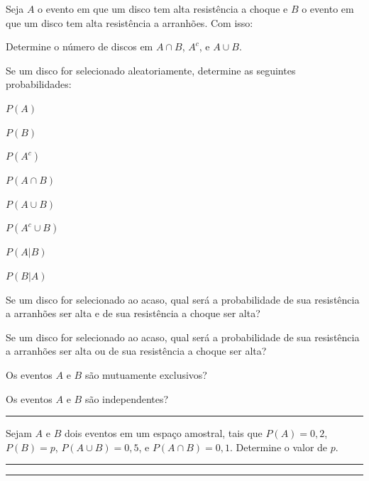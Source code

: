 \documentclass[a4paper,11pt,fleqn]{article}\usepackage[]{graphicx}\usepackage[]{color}
\theoremstyle{definition}
\begin{document}
\begin{compactenum}
  Seja $A$ o evento em que um disco tem alta resistência a choque e $B$
  o evento em que um disco tem alta resistência a arranhões. Com isso:
  \begin{compactenum}
  \item Determine o número de discos em $A \cap B$, $A^{c}$, e $A \cup B$.
  \item Se um disco for selecionado aleatoriamente, determine as
    seguintes probabilidades: \\
    \begin{inparaenum}
    \item $P(A)$ \,
    \item $P(B)$ \,
    \item $P(A^{c})$ \,
    \item $P(A \cap B)$ \,
    \item $P(A \cup B)$ \,
    \item $P(A^{c} \cup B)$ \,
    \item $P(A|B)$ \,
    \item $P(B|A)$
    \end{inparaenum}
  \item Se um disco for selecionado ao acaso, qual será a probabilidade
    de sua resistência a arranhões ser alta e de sua resistência a
    choque ser alta?
  \item Se um disco for selecionado ao acaso, qual será a probabilidade
    de sua resistência a arranhões ser alta ou de sua resistência a
    choque ser alta?
  \item Os eventos $A$ e $B$ são mutuamente exclusivos?
  \item Os eventos $A$ e $B$ são independentes?
  \end{compactenum}

\vspace{0.3cm}
\hrule
\vspace{0.3cm}

\item Sejam $A$ e $B$ dois eventos em um espaço amostral, tais que $P(A)
  = 0,2$, $P(B) = p$, $P(A \cup B) = 0,5$, e $P(A \cap B) =
  0,1$. Determine o valor de $p$.

\vspace{0.3cm}
\hrule
\vspace{0.3cm}

\clearpage

\vspace{0.3cm}
\hrule
\vspace{0.3cm}


\end{compactenum}
\end{document}
